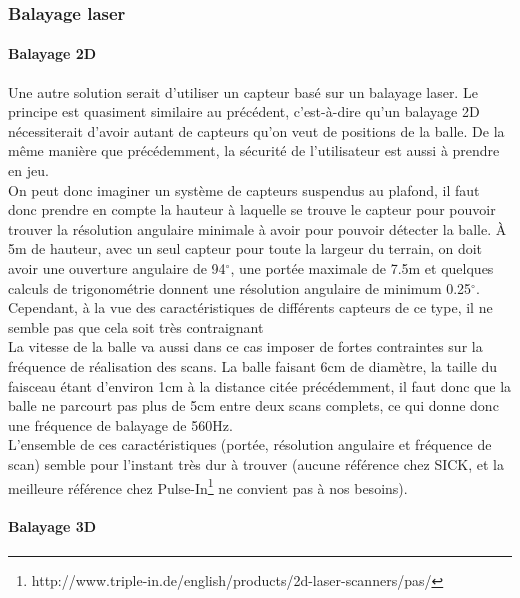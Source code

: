 \subsubsection{Balayage laser}

\paragraph{Balayage 2D\\}

Une autre solution serait d'utiliser un capteur basé sur un balayage laser. Le principe est quasiment similaire au précédent, c'est-à-dire qu'un balayage 2D nécessiterait d'avoir autant de capteurs qu'on veut de positions de la balle. De la même manière que précédemment, la sécurité de l'utilisateur est aussi à prendre en jeu. \\

On peut donc imaginer un système de capteurs suspendus au plafond, il faut donc prendre en compte la hauteur à laquelle se trouve le capteur pour pouvoir trouver la résolution angulaire minimale à avoir pour pouvoir détecter la balle. À 5m de hauteur, avec un seul capteur pour toute la largeur du terrain, on doit avoir une ouverture angulaire de 94$^{\circ}$, une portée maximale de 7.5m et quelques calculs de trigonométrie donnent une résolution angulaire de minimum 0.25$^{\circ}$. Cependant, à la vue des caractéristiques de différents capteurs de ce type, il ne semble pas que cela soit très contraignant \\ 

La vitesse de la balle va aussi dans ce cas imposer de fortes contraintes sur la fréquence de réalisation des scans. La balle faisant 6cm de diamètre, la taille du faisceau étant d'environ 1cm à la distance citée précédemment, il faut donc que la balle ne parcourt pas plus de 5cm entre deux scans complets, ce qui donne donc une fréquence de balayage de 560Hz. \\

L'ensemble de ces caractéristiques (portée, résolution angulaire et fréquence de scan) semble pour l'instant très dur à trouver (aucune référence chez SICK, et la meilleure référence chez Pulse-In\footnote{http://www.triple-in.de/english/products/2d-laser-scanners/pas/} ne convient pas à nos besoins). 


\paragraph{Balayage 3D\\}

